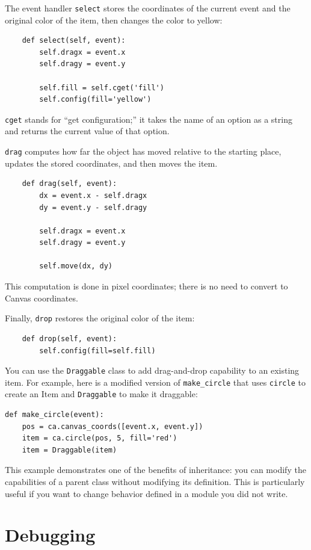 \documentclass[10pt]{book}
\begin{document}
\begin{CJK}{UTF8}{gbsn}
The event handler {\tt select} stores the coordinates
of the current event and the original color of the item, then
changes the color to yellow:

\begin{verbatim}
    def select(self, event):
        self.dragx = event.x
        self.dragy = event.y

        self.fill = self.cget('fill')
        self.config(fill='yellow')
\end{verbatim}
%
{\tt cget} stands for ``get configuration;'' it takes the name of an
option as a string and returns the current value of that option.

{\tt drag} computes how far the object has moved relative to the
starting place, updates the stored coordinates, and then moves the
item.

\begin{verbatim}
    def drag(self, event):
        dx = event.x - self.dragx
        dy = event.y - self.dragy

        self.dragx = event.x
        self.dragy = event.y

        self.move(dx, dy)
\end{verbatim}
%
This computation is done in pixel coordinates; there is no need to
convert to Canvas coordinates.

Finally, {\tt drop} restores the original color of the item:

\begin{verbatim}
    def drop(self, event):
        self.config(fill=self.fill)
\end{verbatim}
%
You can use the {\tt Draggable} class to add drag-and-drop
capability to an existing item.  For example, here is a modified
version of \verb"make_circle" that uses {\tt circle} to create
an Item and {\tt Draggable} to make it draggable:

\begin{verbatim}
def make_circle(event):
    pos = ca.canvas_coords([event.x, event.y])
    item = ca.circle(pos, 5, fill='red')
    item = Draggable(item)
\end{verbatim}
%
This example demonstrates one of the benefits of inheritance: you can
modify the capabilities of a parent class without modifying its
definition.  This is particularly useful if you want to change
behavior defined in a module you did not write.


\section{Debugging}


\end{CJK}
\end{document}
